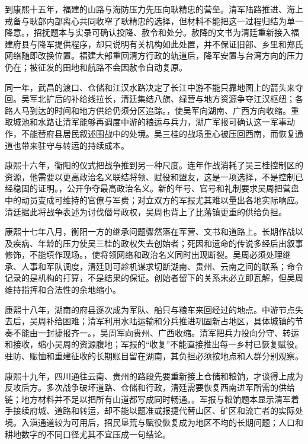 到康熙十五年，福建的山路与海防压力先压向耿精忠的营垒。清军陆路推进、海上戒备与耿部内部离心共同收窄了耿精忠的选择，但材料不能把这一过程归结为单一降意。，招抚题本与实录可确认投降、赦令和处分。赦降的文书为清廷重新接入福建府县与降军提供程序，却只说明有关机构如此处置，并不保证旧部、乡里和郑氏网络随即改换位置。福建大部重回清方行政的轨道后，降军安置与台湾方向的压力仍在；被征发的田地和航路不会因赦令自动复原。

同一年，武昌的渡口、仓储和江汉水路决定了长江中游不能只靠地图上的箭头来夺回。吴军北扩后的补给线拉长，清廷集结八旗、绿营与地方资源争夺江汉枢纽；各路人马到达的时间和地方供给仍须分区追踪。，使吴军向湖南、广西方向收缩。重取城池和水路让清军能够再调度中游的粮运与兵力，湖广军报可确认这一军事动作，不能替府县居民叙述围战中的处境。吴三桂的战场重心被压回西南，而恢复通道也带来驻守与转运的持续成本。

康熙十六年，衡阳的仪式把战争推到另一种尺度。连年作战消耗了吴三桂控制区的资源，他需要以更高政治名义联结将领、赋役和盟友，这是一项选择，不是控制已经稳固的证明。，公开争夺最高政治名义。新的年号、官号和礼制要求吴周把营盘中的动员变成可维持的官僚与军费；对立双方的军报尤其难以量出各地实际响应。清廷据此将战争表述为讨伐僭号政权，吴周也背上了比藩镇更重的供给负担。

康熙十七年八月，衡阳一方的继承问题骤然落在军营、文书和道路上。长期作战以及疾病、年龄的压力使吴三桂的政权失去创始者；死因和遗命的传说多经后出叙事修饰，不能填作现场。，使将领网络和政治名义同时出现断裂。吴周必须处理继承、人事和军队调度，清廷则可趁机谋求切断湖南、贵州、云南之间的联系；命令记录的是机构的打算，不是结果的保证。创始者留下的关系未必立即瓦解，但吴周维持指挥和合法性的余地缩小。

康熙十八年，湖南的府县逐次成为军队、船只与粮车来回经过的地点。中游节点失去后，吴周补给困难；清军利用水陆运输和分兵推进巩固新占地区，具体城镇的节奏不能由一封捷报齐一。，吴周军向贵州、广西收缩。清军把兵力投向分守、转运和接收，缩小吴周的资源腹地；军报的“收复”不能直接推出每一乡村已恢复赋役。驻防、赈恤和重建征收的长期账目留在湖南，其负担必须按地点和人群分别观察。

康熙十九年，四川通往云南、贵州的路段先要重新接上仓储和粮饷，才谈得上成为反攻后方。多次战争破坏道路、仓储和行政，清廷需要恢复西南进军所需的供给链；地方材料并不足以把所有山道都写成同时畅通。。军报与粮饷题本显示清军着手接续府城、道路和转运，却不能以题准或报捷代替山区、矿区和流亡者的实际处境。入滇通道较为可用后，招民垦荒与赋役恢复成为地区不均的长期问题；人口和耕地数字的不同口径尤其不宜压成一句结论。

